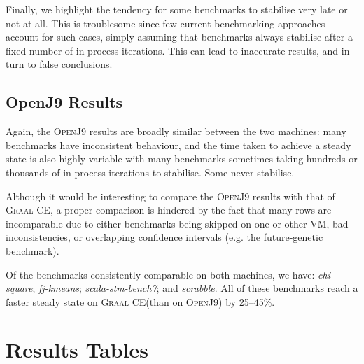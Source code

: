 \documentclass[a4paper]{article}
\newcommand{\graalce}{\textsc{Graal CE}\xspace}
\newcommand{\graalcehs}{\textsc{Graal CE Hotspot}\xspace}
\newcommand{\jnine}{\textsc{OpenJ9}\xspace}
\newcommand{\bencherseven}{Linux$_\mathrm{1240v5}$\xspace}
\newcommand{\bencherten}{Linux$_\mathrm{1240v6}$\xspace}
\begin{document}
Finally, we highlight the tendency for some benchmarks to stabilise very late
or not at all. This is troublesome since few current benchmarking approaches
account for such cases, simply assuming that benchmarks always stabilise after
a fixed number of in-process iterations. This can lead to inaccurate results,
and in turn to false conclusions.

\subsection{OpenJ9 Results}

Again, the \jnine results are broadly similar between the two machines: many
benchmarks have inconsistent behaviour, and the time taken to achieve a steady
state is also highly variable with many benchmarks sometimes taking hundreds or
thousands of in-process iterations to stabilise. Some never stabilise.

Although it would be interesting to compare the \jnine results with that of \graalce,
a proper comparison is hindered by the fact that many rows are incomparable due
to either benchmarks being skipped on one or other VM, bad inconsistencies, or
overlapping confidence intervals (e.g. the future-genetic benchmark).

Of the benchmarks consistently comparable on both machines, we have:
\emph{chi-square}; \emph{fj-kmeans}; \emph{scala-stm-bench7}; and
\emph{scrabble}. All of these benchmarks reach a faster steady state on
\graalce (than on \jnine) by 25--45$\%$.





\appendix

\section{Results Tables}

\newcommand{\captionbsevengraalce}{Results for \graalce on \bencherseven.}


\newpage
\newcommand{\captionbsevengraalcehs}{Results for \graalcehs on \bencherseven.}


\newpage
\newcommand{\captionbsevenjnine}{Results for \jnine on \bencherseven.}


\newpage
\newcommand{\captionbtengraalce}{Results for \graalce on \bencherten.}


\newpage
\newcommand{\captionbtengraalcehs}{Results for \graalcehs on \bencherten.}

\end{document}
